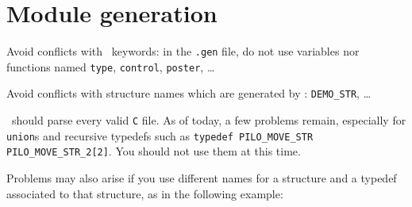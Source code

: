 %
%
%
%
%
%
%

\section{Module generation}

Avoid conflicts with \GenoM\ keywords: in the \texttt{.gen} file, do not use
variables nor functions named \texttt{type}, \texttt{control}, \texttt{poster},
\ldots

Avoid conflicts with structure names which are generated by \GenoM: 
\texttt{DEMO\_STR}, \ldots

\GenoM\ should parse every valid \texttt{C} file. As of today, a few
problems remain, especially for \texttt{union}s and  recursive typedefs such as
\texttt{typedef  PILO\_MOVE\_STR PILO\_MOVE\_STR\_2[2]}.  You should not use
them at this time.

Problems may also arise if you use different names for  a structure and a
typedef associated to that structure, as in the following example:

